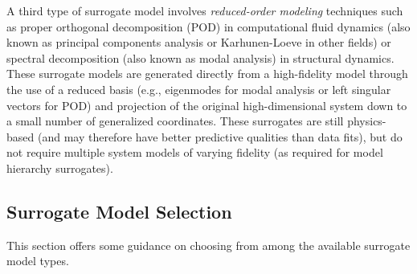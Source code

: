 A third type of surrogate model involves {\em reduced-order modeling}
techniques such as proper orthogonal decomposition (POD) in
computational fluid dynamics (also known as principal components
analysis or Karhunen-Loeve in other fields) or spectral decomposition
(also known as modal analysis) in structural dynamics.  These
surrogate models are generated directly from a high-fidelity model
through the use of a reduced basis (e.g., eigenmodes for modal
analysis or left singular vectors for POD) and projection of the
original high-dimensional system down to a small number of generalized
coordinates.  These surrogates are still physics-based (and may
therefore have better predictive qualities than data fits), but do not
require multiple system models of varying fidelity (as required for
model hierarchy surrogates).

\subsection{Surrogate Model Selection}

This section offers some guidance on choosing from among the available
surrogate model types.

